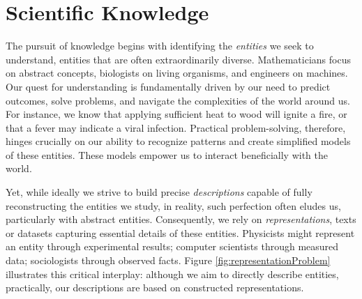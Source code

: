 %
%

\section{Scientific Knowledge}

The pursuit of knowledge begins with identifying the \emph{entities} we seek to understand, entities that are often extraordinarily diverse. Mathematicians focus on abstract concepts, biologists on living organisms, and engineers on machines. Our quest for understanding is fundamentally driven by our need to predict outcomes, solve problems, and navigate the complexities of the world around us. For instance, we know that applying sufficient heat to wood will ignite a fire, or that a fever may indicate a viral infection. Practical problem-solving, therefore, hinges crucially on our ability to recognize patterns and create simplified models of these entities. These models empower us to interact beneficially with the world.

Yet, while ideally we strive to build precise \emph{descriptions} capable of fully reconstructing the entities we study, in reality, such perfection often eludes us, particularly with abstract entities. Consequently, we rely on \emph{representations}, texts or datasets capturing essential details of these entities. Physicists might represent an entity through experimental results; computer scientists through measured data; sociologists through observed facts. Figure \ref{fig:representationProblem} illustrates this critical interplay: although we aim to directly describe entities, practically, our descriptions are based on constructed representations.

% 

